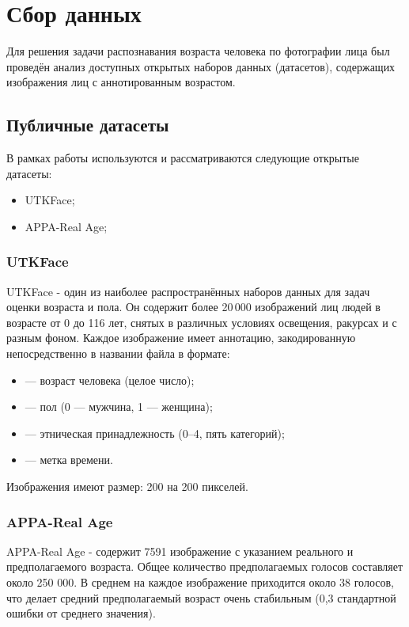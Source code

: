 \chapter{Сбор данных}
Для решения задачи распознавания возраста человека по фотографии лица был проведён анализ доступных открытых наборов данных (датасетов), содержащих изображения лиц с аннотированным возрастом.  


\section*{Публичные датасеты}
В рамках работы используются и рассматриваются следующие открытые датасеты:
\begin{itemize}
	\item UTKFace;
	\item APPA-Real Age;
\end{itemize}
\subsection*{UTKFace}
UTKFace - один из наиболее распространённых наборов данных для задач оценки возраста и пола.  
Он содержит более 20\,000 изображений лиц людей в возрасте от 0 до 116 лет, снятых в различных условиях освещения, ракурсах и с разным фоном.  \cite{zhifei2017cvpr}
Каждое изображение имеет аннотацию, закодированную непосредственно в названии файла в формате:
\begin{center}
\end{center}
\begin{itemize}
	\item {} — возраст человека (целое число);
	\item {} — пол (0 — мужчина, 1 — женщина);
	\item {} — этническая принадлежность (0–4, пять категорий);
	\item {} — метка времени.
\end{itemize}

Изображения имеют размер: 200 на 200 пикселей.

\subsection*{APPA-Real Age}
APPA-Real Age - содержит 7591 изображение с указанием реального и предполагаемого возраста. Общее количество предполагаемых голосов составляет около 250 000. В среднем на каждое изображение приходится около 38 голосов, что делает средний предполагаемый возраст очень стабильным (0,3 стандартной ошибки от среднего значения). \cite{agustsson2017appareal}

